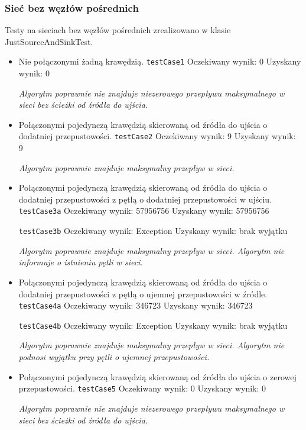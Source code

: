 \subsubsection{Sieć bez węzłów pośrednich}
Testy na sieciach bez węzłów pośrednich zrealizowano w klasie JustSourceAndSinkTest.
\begin{itemize}[nosep]
    \item Nie połączonymi żadną krawędzią.
    \texttt{testCase1}
    Oczekiwany wynik: 0
    Uzyskany wynik: 0

    \emph{Algorytm poprawnie nie znajduje niezerowego przepływu maksymalnego
    w sieci bez ścieżki od źródła do ujścia.}

    \item Połączonymi pojedynczą krawędzią skierowaną od źródła do ujścia o dodatniej przepustowości.
    \texttt{testCase2}
    Oczekiwany wynik: 9
    Uzyskany wynik: 9

    \emph{Algorytm poprawnie znajduje maksymalny przepływ w sieci.}

    \item Połączonymi pojedynczą krawędzią skierowaną od źródła do ujścia o dodatniej przepustowości z pętlą o dodatniej przepustowości w ujściu.
    \texttt{testCase3a}
    Oczekiwany wynik: 57956756
    Uzyskany wynik: 57956756

    \texttt{testCase3b}
    Oczekiwany wynik: Exception
    Uzyskany wynik: brak wyjątku

    \emph{Algorytm poprawnie znajduje maksymalny przepływ w sieci. Algorytm
    nie informuje o istnieniu pętli w sieci.}

    \item Połączonymi pojedynczą krawędzią skierowaną od źródła do ujścia o dodatniej przepustowości z pętlą o ujemnej przepustowości w źródle.
    \texttt{testCase4a}
    Oczekiwany wynik: 346723
    Uzyskany wynik: 346723

    \texttt{testCase4b}
    Oczekiwany wynik: Exception
    Uzyskany wynik: brak wyjątku

    \emph{Algorytm poprawnie znajduje maksymalny przepływ w sieci. Algorytm
    nie podnosi wyjątku przy pętli o ujemnej przepustowości.}

    \item Połączonymi pojedynczą krawędzią skierowaną od źródła do ujścia o zerowej przepustowości.
    \texttt{testCase5}
    Oczekiwany wynik: 0
    Uzyskany wynik: 0

    \emph{Algorytm poprawnie nie znajduje niezerowego przepływu maksymalnego
    w sieci bez ścieżki od źródła do ujścia.}


\end{itemize}
